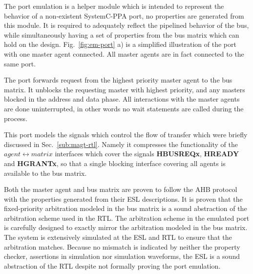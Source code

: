 The port emulation is a helper module which is intended to represent the behavior of a non-existent SystemC-PPA port, no properties are generated from this module. It is required to adequately reflect the pipelined behavior of the bus, while simultaneously having a set of properties from the bus matrix which can hold on the design. Fig.~\ref{fig:em-port} a) is a simplified illustration of the port with one master agent connected. All master agents are in fact connected to the same port. \par
The port forwards request from the highest priority master agent to the bus matrix. It unblocks the requesting master with highest priority, and any masters blocked in the address and data phase. All interactions with the master agents are done uninterrupted, in other words no wait statements are called during the process. \par
This port models the signals which control the flow of transfer which were briefly discussed in Sec.~\ref{sub:magt-rtl}. Namely it compresses the functionality of the $agent\leftrightarrow matrix$ interfaces which cover the signals \textbf{HBUSREQx}, \textbf{HREADY} and \textbf{HGRANTx}, so that a single blocking interface covering all agents is available to the bus matrix. \par
Both the master agent and bus matrix are proven to follow the AHB protocol with the properties generated from their ESL descriptions. It is proven that the fixed-priority arbitration modeled in the bus matrix is a sound abstraction of the arbitration scheme used in the RTL. The arbitration scheme in the emulated port is carefully designed to exactly mirror the arbitration modeled in the bus matrix. The system is extensively simulated at the ESL and RTL to ensure that the arbitration matches. Because no mismatch is indicated by neither the property checker, assertions in simulation nor simulation waveforms, the ESL is a sound abstraction of the RTL despite not formally proving the port emulation.  





